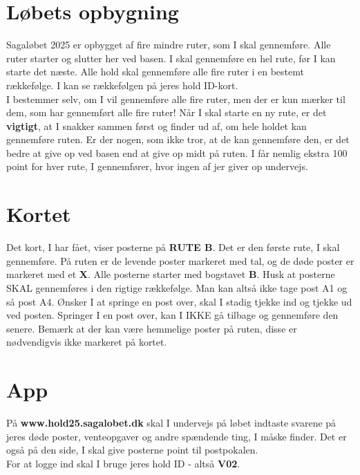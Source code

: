 \section{Løbets opbygning}
Sagaløbet 2025 er opbygget af fire mindre ruter, som I skal gennemføre. Alle ruter starter og slutter her ved basen. I skal gennemføre en hel rute, før I kan starte det næste. Alle hold skal gennemføre alle fire ruter i en bestemt rækkefølge. I kan se rækkefølgen på jeres hold ID-kort.\\\newline
I bestemmer selv, om I vil gennemføre alle fire ruter, men der er kun mærker til dem, som har gennemført alle fire ruter! Når I skal starte en ny rute, er det \textbf{vigtigt}, at I snakker sammen først og finder ud af, om hele holdet kan gennemføre ruten. Er der nogen, som ikke tror, at de kan gennemføre den, er det bedre at give op ved basen end at give op midt på ruten. I får nemlig ekstra 100 point for hver rute, I gennemfører, hvor ingen af jer giver op undervejs.\\
\section{Kortet}
Det kort, I har fået, viser posterne på \textbf{RUTE B}. Det er den første rute, I skal gennemføre. På ruten er de levende poster markeret med tal, og de døde poster er markeret med et \textbf{X}. Alle posterne starter med bogstavet \textbf{B}. Husk at posterne SKAL gennemføres i den rigtige rækkefølge. Man kan altså ikke tage post A1 og så post A4. Ønsker I at springe en post over, skal I stadig tjekke ind og tjekke ud ved posten. Springer I en post over, kan I IKKE gå tilbage og gennemføre den senere. Bemærk at der kan være hemmelige poster på ruten, disse er nødvendigvis ikke markeret på kortet.
\section{App}
På \textbf{www.hold25.sagalobet.dk} skal I undervejs på løbet indtaste svarene på jeres døde poster, venteopgaver og andre spændende ting, I måske finder. Det er også på den side, I skal give posterne point til postpokalen.\\
For at logge ind skal I bruge jeres hold ID - altså \textbf{V02}.
\newpage
